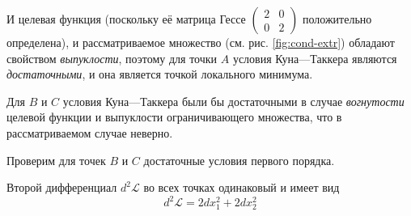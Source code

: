 \documentclass{article}
\providecommand{\La}{\mathcal{L}}
\numberwithin{equation}{section}
\begin{document}
И целевая функция (поскольку её матрица Гессе
$\left( \begin{smallmatrix}2 & 0 \\ 0 & 2\end{smallmatrix} \right)$
положительно определена), и рассматриваемое множество (см. рис.
\ref{fig:cond-extr}) обладают свойством \emph{выпуклости}, поэтому для
точки $A$ условия Куна—Таккера являются \emph{достаточными}, и она
является точкой локального минимума.

Для $B$ и $C$ условия Куна—Таккера были бы достаточными в случае
\emph{вогнутости} целевой функции и выпуклости ограничивающего
множества, что в рассматриваемом случае неверно.

Проверим для точек $B$ и $C$ достаточные условия первого порядка.

Второй дифференциал $d^2\La$ во всех точках одинаковый и имеет вид
\begin{equation}
  \label{eq:la-diff}
  d^2\La = 2dx_1^2 + 2 dx_2^2
\end{equation}
\end{document}

